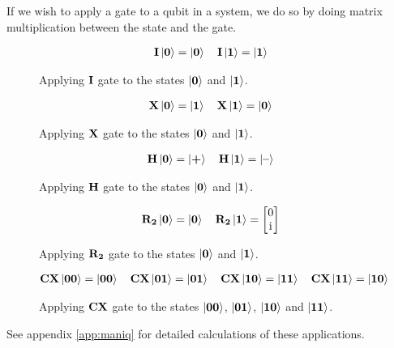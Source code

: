 \noindent
If we wish to apply a gate to a qubit in a system, we do so by doing matrix multiplication between the state and the gate. 
\begin{figure}[H]
    \centering
    \begin{align*}
        \mathbf{I}\ket{\mathbf{0}}=\ket{\mathbf{0}}\quad
        \mathbf{I}\ket{\mathbf{1}}=\ket{\mathbf{1}}
    \end{align*}
    \caption{Applying $\mathbf{I}$ gate to the states $\ket{\mathbf{0}}$ and $\ket{\mathbf{1}}$.}
    \label{fig:i}
\end{figure}

\begin{figure}[H]
    \centering
    \begin{align*}
        \mathbf{X}\ket{\mathbf{0}}=\ket{\mathbf{1}}\quad
        \mathbf{X}\ket{\mathbf{1}}=\ket{\mathbf{0}}
    \end{align*}
    \caption{Applying $\mathbf{X}$ gate to the states $\ket{\mathbf{0}}$ and $\ket{\mathbf{1}}$.}
    \label{fig:x}
\end{figure}

\begin{figure}[H]
    \centering
    \begin{align*}
        \mathbf{H}\ket{\mathbf{0}}=\ket{\textbf{+}}\quad
        \mathbf{H}\ket{\mathbf{1}}=\ket{\textbf{--}}
    \end{align*}
    \caption{Applying $\mathbf{H}$ gate to the states $\ket{\mathbf{0}}$ and $\ket{\mathbf{1}}$.}
    \label{fig:h}
\end{figure}

\begin{figure}[H]
    \centering
    \begin{align*}
        \mathbf{R_{2}}\ket{\mathbf{0}}=\ket{\mathbf{0}}\quad
        \mathbf{R_{2}}\ket{\mathbf{1}}=
        \begin{bmatrix}
            0\\
            \mathrm{i}\\
        \end{bmatrix}
    \end{align*}
    \caption{Applying $\mathbf{R_{2}}$ gate to the states $\ket{\mathbf{0}}$ and $\ket{\mathbf{1}}$.}
    \label{fig:r2}
\end{figure}

\begin{figure}[H]
    \centering
    \begin{align*}
        \mathbf{CX}\ket{\mathbf{0}\mathbf{0}}=\ket{\mathbf{0}\mathbf{0}}\quad
        \mathbf{CX}\ket{\mathbf{0}\mathbf{1}}=\ket{\mathbf{0}\mathbf{1}}\quad
        \mathbf{CX}\ket{\mathbf{1}\mathbf{0}}=\ket{\mathbf{1}\mathbf{1}}\quad
        \mathbf{CX}\ket{\mathbf{1}\mathbf{1}}=\ket{\mathbf{1}\mathbf{0}}
    \end{align*}
    \caption{Applying $\mathbf{CX}$ gate to the states $\ket{\mathbf{0}\mathbf{0}}$, $\ket{\mathbf{0}\mathbf{1}}$, $\ket{\mathbf{1}\mathbf{0}}$ and $\ket{\mathbf{1}\mathbf{1}}$.}
    \label{fig:cx}
\end{figure}
\noindent
See appendix \ref{app:maniq} for detailed calculations of these applications. 


